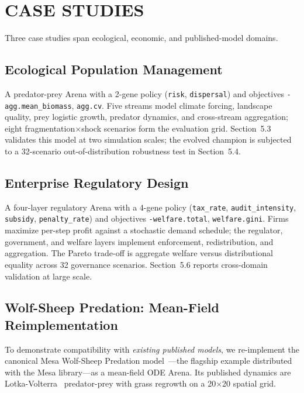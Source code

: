 \documentclass{wscpaperproc}
\begin{document}
\section{CASE STUDIES}

Three case studies span ecological, economic, and published-model domains.

\subsection{Ecological Population Management}

A predator-prey Arena with a 2-gene policy (\texttt{risk},
\texttt{dispersal}) and objectives \texttt{-agg.mean\_biomass},
\texttt{agg.cv}. Five streams model climate forcing, landscape quality, prey
logistic growth, predator dynamics, and cross-stream aggregation; eight
fragmentation$\times$shock scenarios form the evaluation grid.
Section~5.3 validates this model at two simulation scales; the evolved champion
is subjected to a 32-scenario out-of-distribution robustness test in
Section~5.4.

\subsection{Enterprise Regulatory Design}

A four-layer regulatory Arena with a 4-gene policy
(\texttt{tax\_rate}, \texttt{audit\_intensity}, \texttt{subsidy},
\texttt{penalty\_rate}) and objectives \texttt{-welfare.total},
\texttt{welfare.gini}. Firms maximize per-step profit against a stochastic
demand schedule; the regulator, government, and welfare layers implement
enforcement, redistribution, and aggregation. The Pareto trade-off is
aggregate welfare versus distributional equality across 32 governance scenarios.
Section~5.6 reports cross-domain validation at large scale.

\subsection{Wolf-Sheep Predation: Mean-Field Reimplementation}
\label{sec:wolfsheep}

To demonstrate compatibility with \emph{existing published models}, we
re-implement the canonical Mesa Wolf-Sheep Predation model~\cite{wilensky1997wolfsheep,kazil2020mesa}---the flagship example distributed with the Mesa library---as a mean-field ODE Arena.
Its published dynamics are Lotka-Volterra~\cite{lotka1925elements,volterra1926variazioni} predator-prey with grass regrowth on a
20$\times$20 spatial grid.
\end{document}
